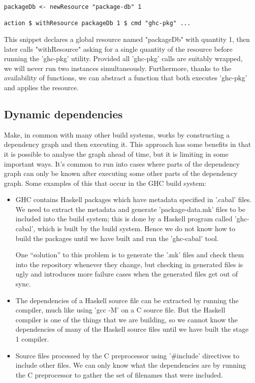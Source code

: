 \begin{lstlisting}
packageDb <- newResource "package-db" 1

action $ withResource packageDb 1 $ cmd "ghc-pkg" ...
\end{lstlisting}

This snippet declares a global resource named \lst"packageDb" with quantity 1,
then later calls \lst"withResource" asking for a single quantity of the resource before running the
\lst'ghc-pkg' utility. Provided all \lst'ghc-pkg' calls are suitably wrapped,
we will never run two instances simultaneously. Furthermore, thanks to the
availability of functions, we can abstract a function that both executes
\lst'ghc-pkg' and applies the resource.

\subsection{Dynamic dependencies\label{sec:dynamic-deps}}


Make, in common with many other build systems, works by
constructing a dependency graph and then executing it. This approach
has some benefits in that it is possible to analyse the graph ahead of
time, but it is limiting in some important ways.  It's common to run
into cases where parts of the dependency graph can only be known after
executing some other parts of the dependency graph.  Some examples of
this that occur in the GHC build system:

\begin{itemize}
\item GHC contains Haskell packages which have metadata specified in
  \lst'.cabal' files. We need to extract the metadata and generate
  \lst'package-data.mk' files to be included into the build system; this
  is done by a Haskell program called \lst'ghc-cabal', which is built by the
  build system. Hence we do not know how to build the packages until we have
  built and run the \lst'ghc-cabal' tool.

  One ``solution'' to this problem is to generate the \lst'.mk'
  files and check them into the repository whenever they change, but
  checking in generated files is ugly and introduces more failure
  cases when the generated files get out of sync.

\item The dependencies of a Haskell source file can be extracted by
  running the compiler, much like using \lst'gcc -M' on a C source
  file.  But the Haskell compiler is one of the things that we are
  building, so we cannot know the dependencies of many of the Haskell
  source files until we have built the stage 1 compiler.

\item Source files processed by the C preprocessor using
  \lst'#include' directives to include other files.  We can only
  know what the dependencies are by running the C preprocessor to
  gather the set of filenames that were included.
\end{itemize}

